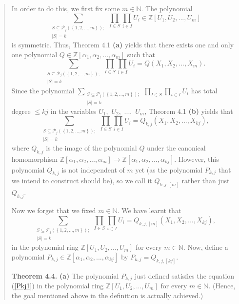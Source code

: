 \documentclass[numbers=enddot,12pt,final,onecolumn,notitlepage]{scrartcl}%
\begin{document}
\begin{quote}
In order to do this, we first fix some $m\in\mathbb{N}$. The polynomial%
\[
\sum_{\substack{S\subseteq\mathcal{P}_{j}\left(  \left\{  1,2,...,m\right\}
\right)  ;\\\left\vert S\right\vert =k}}\prod_{I\in S}\prod_{i\in I}U_{i}%
\in\mathbb{Z}\left[  U_{1},U_{2},...,U_{m}\right]
\]
is symmetric. Thus, Theorem 4.1 \textbf{(a)} yields that there exists one and
only one polynomial $Q\in\mathbb{Z}\left[  \alpha_{1},\alpha_{2}%
,...,\alpha_{m}\right]  $ such that%
\[
\sum_{\substack{S\subseteq\mathcal{P}_{j}\left(  \left\{  1,2,...,m\right\}
\right)  ;\\\left\vert S\right\vert =k}}\prod_{I\in S}\prod_{i\in I}%
U_{i}=Q\left(  X_{1},X_{2},...,X_{m}\right)  .
\]
Since the polynomial $\sum\limits_{\substack{S\subseteq\mathcal{P}_{j}\left(
\left\{  1,2,...,m\right\}  \right)  ;\\\left\vert S\right\vert =k}%
}\prod\limits_{I\in S}\prod\limits_{i\in I}U_{i}$ has total degree $\leq kj$
in the variables $U_{1},$ $U_{2},$ $...,$ $U_{m}$, Theorem 4.1 \textbf{(b)}
yields that%
\[
\sum_{\substack{S\subseteq\mathcal{P}_{j}\left(  \left\{  1,2,...,m\right\}
\right)  ;\\\left\vert S\right\vert =k}}\prod_{I\in S}\prod_{i\in I}%
U_{i}=Q_{k,j}\left(  X_{1},X_{2},...,X_{kj}\right)  ,
\]
where $Q_{k,j}$ is the image of the polynomial $Q$ under the canonical
homomorphism $\mathbb{Z}\left[  \alpha_{1},\alpha_{2},...,\alpha_{m}\right]
\rightarrow\mathbb{Z}\left[  \alpha_{1},\alpha_{2},...,\alpha_{kj}\right]  $.
However, this polynomial $Q_{k,j}$ is not independent of $m$ yet (as the
polynomial $P_{k,j}$ that we intend to construct should be), so we call it
$Q_{k,j,\left[  m\right]  }$ rather than just $Q_{k,j}$.

Now we forget that we fixed $m\in\mathbb{N}$. We have learnt that%
\[
\sum_{\substack{S\subseteq\mathcal{P}_{j}\left(  \left\{  1,2,...,m\right\}
\right)  ;\\\left\vert S\right\vert =k}}\prod_{I\in S}\prod_{i\in I}%
U_{i}=Q_{k,j,\left[  m\right]  }\left(  X_{1},X_{2},...,X_{kj}\right)  ,
\]
in the polynomial ring $\mathbb{Z}\left[  U_{1},U_{2},...,U_{m}\right]  $ for
every $m\in\mathbb{N}$. Now, define a polynomial $P_{k,j}\in\mathbb{Z}\left[
\alpha_{1},\alpha_{2},...,\alpha_{kj}\right]  $ by $P_{k,j}=Q_{k,j,\left[
kj\right]  }.$

\textbf{Theorem 4.4.} \textbf{(a)} The polynomial $P_{k,j}$ just defined
satisfies the equation (\ref{Pkj1}) in the polynomial ring $\mathbb{Z}\left[
U_{1},U_{2},...,U_{m}\right]  $ for every $m\in\mathbb{N}$. (Hence, the goal
mentioned above in the definition is actually achieved.)


\end{quote}
\end{document}
